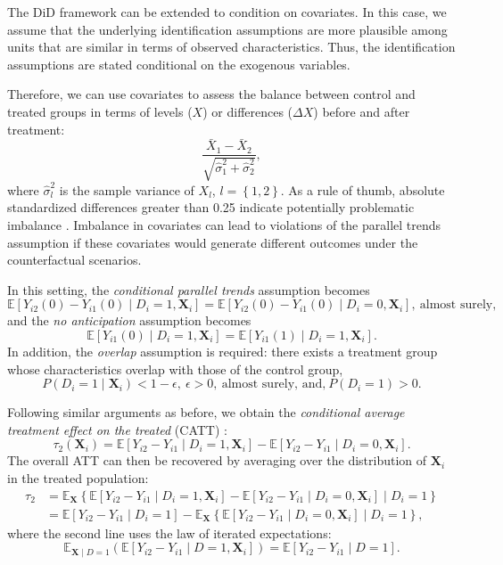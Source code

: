 The DiD framework can be extended to condition on covariates. In this case, we assume that the underlying identification assumptions are more plausible among units that are similar in terms of observed characteristics. Thus, the identification assumptions are stated conditional on the exogenous variables.

Therefore, we can use covariates to assess the balance between control and treated groups in terms of levels ($X$) or differences ($\Delta X$) before and after treatment:
\[
\frac{\bar{X}_1-\bar{X}_2}{\sqrt{\hat{\sigma}_1^2+\hat{\sigma}_2^2}},
\] 
where $\hat{\sigma}_l^2$ is the sample variance of $X_l$, $l=\left\{1,2\right\}$. 
As a rule of thumb, absolute standardized differences greater than 0.25 indicate potentially problematic imbalance \cite{baker2025did_guide}. Imbalance in covariates can lead to violations of the parallel trends assumption if these covariates would generate different outcomes under the counterfactual scenarios.

In this setting, the \textit{conditional parallel trends} assumption becomes
\begin{equation*}
	\mathbb{E}[Y_{i2}(0) - Y_{i1}(0) \mid D_i = 1, \mathbf{X}_i] 
	= \mathbb{E}[Y_{i2}(0) - Y_{i1}(0) \mid D_i = 0, \mathbf{X}_i], \ \text{almost surely,}
\end{equation*}
and the \textit{no anticipation} assumption becomes
\begin{equation*}
	\mathbb{E}[Y_{i1}(0) \mid D_i = 1, \mathbf{X}_i] 
	= \mathbb{E}[Y_{i1}(1) \mid D_i = 1, \mathbf{X}_i].
\end{equation*} 
In addition, the \textit{overlap} assumption is required: there exists a treatment group whose characteristics overlap with those of the control group,
\[
P(D_i = 1 \mid \mathbf{X}_i) < 1 - \epsilon, \ \epsilon >0, \ \text{almost surely, and,} \ P(D_i=1)>0.
\]

Following similar arguments as before, we obtain the \textit{conditional average treatment effect on the treated} (CATT) \cite{baker2025did_guide}:
\[
\tau_2(\mathbf{X}_i)= \mathbb{E}[Y_{i2} - Y_{i1} \mid D_i = 1, \mathbf{X}_i] - \mathbb{E}[Y_{i2} - Y_{i1} \mid D_i = 0, \mathbf{X}_i].
\]
The overall ATT can then be recovered by averaging over the distribution of $\mathbf{X}_i$ in the treated population:
\begin{align*}
	\tau_2 & = \mathbb{E}_{\mathbf{X}}\left\{\mathbb{E}[Y_{i2} - Y_{i1} \mid D_i = 1, \mathbf{X}_i] - \mathbb{E}[Y_{i2} - Y_{i1} \mid D_i = 0, \mathbf{X}_i] \mid D_i = 1\right\}\\
	&=\mathbb{E}[Y_{i2} - Y_{i1} \mid D_i = 1]-\mathbb{E}_{\mathbf{X}}\left\{\mathbb{E}[Y_{i2} - Y_{i1} \mid D_i = 0, \mathbf{X}_i]\mid D_i=1\right\},
\end{align*}
where the second line uses the law of iterated expectations:
\[
\mathbb{E}_{\mathbf{X}\mid D=1}\!\left( \mathbb{E}[Y_{i2}-Y_{i1} \mid D=1, \mathbf{X}_i] \right) 
= \mathbb{E}[Y_{i2}-Y_{i1} \mid D=1].
\]


